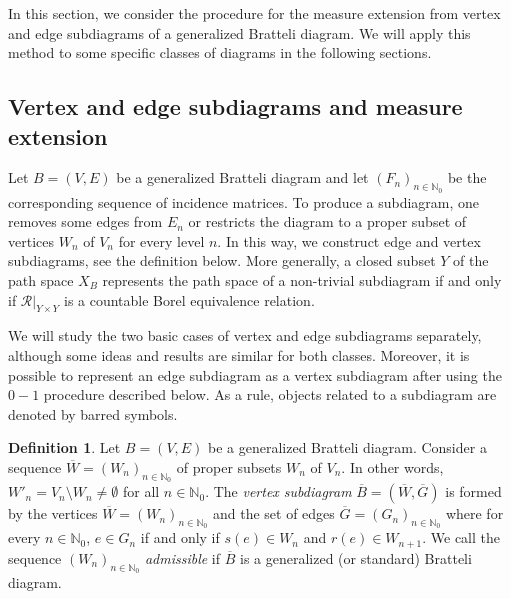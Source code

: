 \documentclass[11pt,reqno]{amsart}
\theoremstyle{definition}
\newtheorem{definition}{Definition}[section]
\theoremstyle{remark}
\theoremstyle{plain}
\def\ol{\overline}
\newcommand{\N}{\mathbb N}
\numberwithin{equation}{section}
\begin{document}
In this section, we consider the procedure for the measure extension from vertex and edge subdiagrams of a generalized Bratteli diagram. We will apply this method to some specific classes of diagrams in the following sections. 

\subsection{Vertex and edge subdiagrams and measure extension}

Let $B = (V,E)$ be a generalized Bratteli diagram and let 
$(F_n)_{n \in \N_0}$ be the corresponding sequence of incidence matrices. To produce a subdiagram, one removes some edges 
from $E_n$ or restricts the diagram to a proper subset of vertices 
$W_n$ of $V_n$ for every level $n$. In this way, we construct 
edge and vertex subdiagrams, see the definition below.  
More generally, a closed subset $Y$ of the path space $X_B$ 
represents the path space of a non-trivial subdiagram if and only if $\mathcal R|_{Y \times Y}$ is a countable Borel equivalence relation. 

We will study the two basic cases of vertex and edge subdiagrams separately, although some ideas and results are similar for both classes. Moreover, it is possible to represent an edge subdiagram as a vertex subdiagram after using the $ 0-1$ procedure described below. As a rule, objects related to a subdiagram are denoted by barred symbols.

\begin{definition}\label{def: vertex sbdgr} 
Let $B = (V, E)$ be a generalized Bratteli diagram. Consider a sequence $\overline W = (W_n)_{n \in \N_0}$ of proper subsets $W_n$ of $V_n$. In other words, $W'_n = V_n \setminus W_n \neq \emptyset$ for all $n \in \N_0$. The {\em vertex subdiagram} $\overline B =  (\ol W, \ol G)$ is formed by the vertices $\ol W= (W_n)_{n \in \N_0}$ and the set of edges $\ol G = (G_n)_{n \in \N_0}$ where for every $n\in \N_0$, $e \in  G_n$ if and only if $s(e) \in W_{n}$ and $r(e) \in W_{n+1}$. We call the sequence $(W_n)_{n \in \N_0}$ \textit{admissible} if
$\ol B$ is a generalized (or standard) Bratteli diagram.
 \end{definition} 
\end{document}
